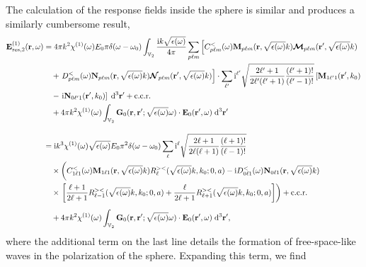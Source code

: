 \documentclass{article}
\begin{document}
The calculation of the response fields inside the sphere is similar and produces a similarly cumbersome result,
\begin{equation}
\begin{split}
\mathbf{E}_\mathrm{res,2}^{(1)}(\mathbf{r},\omega) &= 4\pi k^2\chi^{(1)}(\omega)E_0\pi\delta(\omega - \omega_0)\int_{\mathbb{V}_2}\frac{\mathrm{i}k\sqrt{\epsilon(\omega)}}{4\pi}\sum_{p\ell m}\left[C_{p\ell m}^<(\omega)\mathbf{M}_{p\ell m}(\mathbf{r},\sqrt{\epsilon(\omega)}k)\bm{\mathcal{M}}_{p\ell m}(\mathbf{r}',\sqrt{\epsilon(\omega)}k)\right.\\
&\quad+\left.D_{p\ell m}^<(\omega)\mathbf{N}_{p\ell m}(\mathbf{r},\sqrt{\epsilon(\omega)}k)\bm{\mathcal{N}}_{p\ell m}(\mathbf{r}',\sqrt{\epsilon(\omega)}k)\right]\cdot\sum_{\ell'}\mathrm{i}^{\ell'}\sqrt{\frac{2\ell'+1}{2\ell'(\ell'+1)}\frac{(\ell'+1)!}{(\ell'-1)!}}\left[\mathbf{M}_{1\ell'1}(\mathbf{r}',k_0)\right.\\
&\quad-\left.\mathrm{i}\mathbf{N}_{0\ell'1}(\mathbf{r}',k_0)\right]\;\mathrm{d}^3\mathbf{r}' + \mathrm{c.c.r.}\\
&\quad+ 4\pi k^2\chi^{(1)}(\omega)\int_{\mathbb{V}_2}\mathbf{G}_0(\mathbf{r},\mathbf{r}';\sqrt{\epsilon(\omega)}\omega)\cdot\mathbf{E}_0(\mathbf{r}',\omega)\;\mathrm{d}^3\mathbf{r}'\\[1.0em] 
&= \mathrm{i}k^3\chi^{(1)}(\omega)\sqrt{\epsilon(\omega)}E_0\pi^2\delta(\omega - \omega_0)\sum_\ell\mathrm{i}^{\ell}\sqrt{\frac{2\ell+1}{2\ell(\ell+1)}\frac{(\ell+1)!}{(\ell-1)!}}\\
&\quad\times\left( \vphantom{\frac{\ell + 1}{2\ell + 1}} C_{1\ell1}^<(\omega)\mathbf{M}_{1\ell1}(\mathbf{r},\sqrt{\epsilon(\omega)}k)R_\ell^{><}(\sqrt{\epsilon(\omega)}k,k_0;0,a) - \mathrm{i}D_{0\ell1}^<(\omega)\mathbf{N}_{0\ell1}(\mathbf{r},\sqrt{\epsilon(\omega)}k)\right.\\
&\quad\times\left.\left[\frac{\ell + 1}{2\ell + 1}R_{\ell -1}^{><}(\sqrt{\epsilon(\omega)}k,k_0;0,a) + \frac{\ell}{2\ell + 1}R_{\ell + 1}^{><}(\sqrt{\epsilon(\omega)}k,k_0;0,a)\right]\right) + \mathrm{c.c.r.}\\[0.5em]
&\quad+ 4\pi k^2\chi^{(1)}(\omega)\int_{\mathbb{V}_2}\mathbf{G}_0(\mathbf{r},\mathbf{r}';\sqrt{\epsilon(\omega)}\omega)\cdot\mathbf{E}_0(\mathbf{r}',\omega)\;\mathrm{d}^3\mathbf{r}',
\end{split}
\end{equation}
where the additional term on the last line details the formation of free-space-like waves in the polarization of the sphere. Expanding this term, we find
\end{document}
